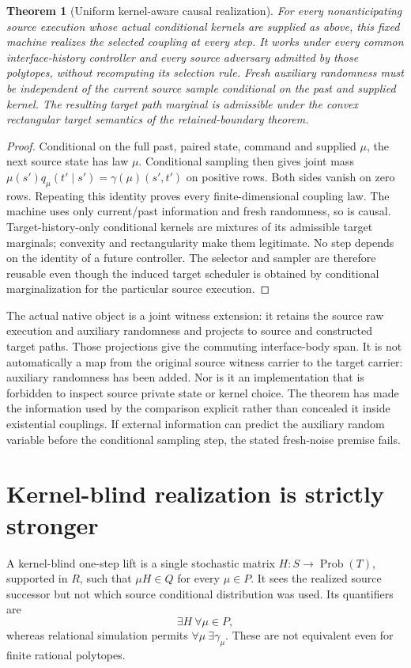\documentclass[11pt]{article}
\newtheorem{theorem}{Theorem}\newtheorem{proposition}{Proposition}\newtheorem{corollary}{Corollary}\newtheorem{definition}{Definition}
\begin{document}
\begin{theorem}[Uniform kernel-aware causal realization]\label{uni-causal}
For every nonanticipating source execution whose actual conditional kernels are supplied as above, this fixed machine realizes the selected coupling at every step. It works under every common interface-history controller and every source adversary admitted by those polytopes, without recomputing its selection rule. Fresh auxiliary randomness must be independent of the current source sample conditional on the past and supplied kernel. The resulting target path marginal is admissible under the convex rectangular target semantics of the retained-boundary theorem.
\end{theorem}
\begin{proof}
Conditional on the full past, paired state, command and supplied $\mu$, the next source state has law $\mu$. Conditional sampling then gives joint mass $\mu(s')q_\mu(t'\mid s')=\gamma(\mu)(s',t')$ on positive rows. Both sides vanish on zero rows. Repeating this identity proves every finite-dimensional coupling law. The machine uses only current/past information and fresh randomness, so is causal. Target-history-only conditional kernels are mixtures of its admissible target marginals; convexity and rectangularity make them legitimate. No step depends on the identity of a future controller. The selector and sampler are therefore reusable even though the induced target scheduler is obtained by conditional marginalization for the particular source execution.
\end{proof}

The actual native object is a joint witness extension: it retains the source raw execution and auxiliary randomness and projects to source and constructed target paths. Those projections give the commuting interface-body span. It is not automatically a map from the original source witness carrier to the target carrier: auxiliary randomness has been added. Nor is it an implementation that is forbidden to inspect source private state or kernel choice. The theorem has made the information used by the comparison explicit rather than concealed it inside existential couplings. If external information can predict the auxiliary random variable before the conditional sampling step, the stated fresh-noise premise fails.

\section{Kernel-blind realization is strictly stronger}
A kernel-blind one-step lift is a single stochastic matrix $H:S\to\operatorname{Prob}(T)$, supported in $R$, such that $\mu H\in Q$ for every $\mu\in P$. It sees the realized source successor but not which source conditional distribution was used. Its quantifiers are
\[
 \exists H\ \forall\mu\in P,
\]
whereas relational simulation permits $\forall\mu\ \exists\gamma_\mu$. These are not equivalent even for finite rational polytopes.
\end{document}
